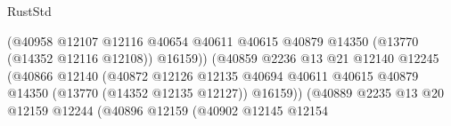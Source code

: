 \begin{lexlean}{RustStd}
\begin{coremodule}
                                                          (@40958
                                                            @12107
                                                            @12116
                                                            @40654
                                                            @40611
                                                            @40615
                                                            @40879
                                                            @14350
                                                            (@13770 (@14352 @12116 @12108))
                                                            @16159))
                                                        (@40859
                                                          @2236
                                                          @13
                                                          @21
                                                          @12140
                                                          @12245
                                                          (@40866
                                                            @12140
                                                            (@40872
                                                              @12126
                                                              @12135
                                                              @40694
                                                              @40611
                                                              @40615
                                                              @40879
                                                              @14350
                                                              (@13770 (@14352 @12135 @12127))
                                                              @16159))
                                                          (@40889
                                                            @2235
                                                            @13
                                                            @20
                                                            @12159
                                                            @12244
                                                            (@40896
                                                              @12159
                                                              (@40902
                                                                @12145
                                                                @12154

\end{coremodule}
\end{lexlean}
